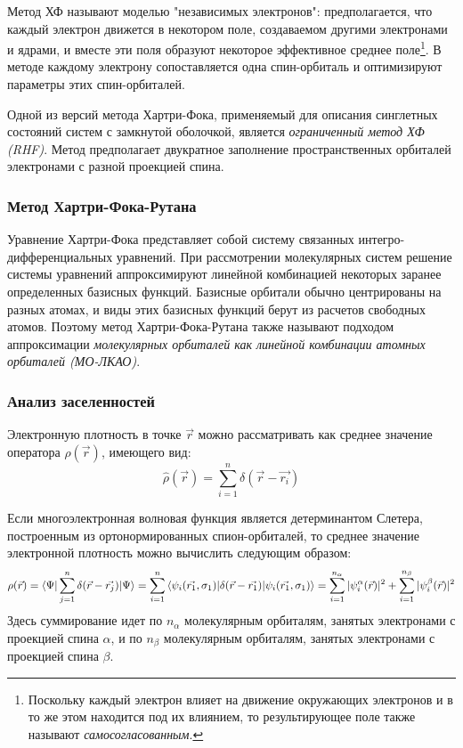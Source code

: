 Метод ХФ называют моделью "независимых электронов": предполагается, что каждый электрон движется в некотором поле, создаваемом другими электронами и ядрами, и вместе эти поля образуют некоторое эффективное среднее поле\footnote{Поскольку каждый электрон влияет на движение окружающих электронов и в то же этом находится под их влиянием, то результирующее поле также называют \textit{самосогласованным}.}. В методе каждому электрону сопоставляется одна спин-орбиталь и оптимизируют параметры этих спин-орбиталей. 

Одной из версий метода Хартри-Фока, применяемый для описания синглетных состояний систем с замкнутой оболочкой, является \textit{ограниченный метод ХФ (RHF)}. Метод предполагает двукратное заполнение пространственных орбиталей электронами с разной проекцией спина.

\subsubsection{Метод Хартри-Фока-Рутана}
Уравнение Хартри-Фока представляет собой систему связанных интегро-дифференциальных уравнений. При рассмотрении молекулярных систем решение системы уравнений аппроксимируют линейной комбинацией некоторых заранее определенных базисных функций. Базисные орбитали обычно центрированы на разных атомах, и виды этих базисных функций берут из расчетов свободных атомов. Поэтому метод Хартри-Фока-Рутана также называют подходом аппроксимации \textit{молекулярных орбиталей как линейной комбинации атомных орбиталей (МО-ЛКАО)}.

\subsubsection{Анализ заселенностей}
Электронную плотность в точке $\Vec{r}$ можно рассматривать как среднее значение оператора $\hat{\rho}(\Vec{r})$, имеющего вид:
\begin{equation}\label{eq:1}
    \hat{\rho}(\Vec{r}) = \sum\limits_{i=1}^n \delta(\Vec{r} - \Vec{r_i})
\end{equation}{}

Если многоэлектронная волновая функция является детерминантом Слетера, построенным из ортонормированных спион-орбиталей, то среднее значение электронной плотность можно вычислить следующим образом:
\begin{equation}\label{eq:2}
    \rho(\Vec{r}) = \braket{\Psi|\sum\limits_{j=1}^n \delta(\Vec{r} - \Vec{r_j})|\Psi} = \sum\limits_{i=1}^n\braket{\psi_i(\Vec{r_1}, \sigma_1)|\delta(\Vec{r} - \Vec{r_1})|\psi_i(\Vec{r_1}, \sigma_1)} = \sum\limits_{i=1}^{n_\alpha}|\psi_i^\alpha(\Vec{r})|^2 + \sum\limits_{i=1}^{n_\beta}|\psi_i^\beta(\Vec{r})|^2
\end{equation}
Здесь суммирование идет по $n_\alpha$ молекулярным орбиталям, занятых электронами с проекцией спина $\alpha$, и по $n_\beta$ молекулярным орбиталям, занятых электронами с проекцией спина $\beta$. 

